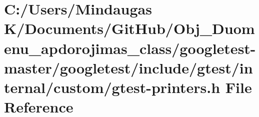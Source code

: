 \hypertarget{googletest-master_2googletest_2include_2gtest_2internal_2custom_2gtest-printers_8h}{}\section{C\+:/\+Users/\+Mindaugas K/\+Documents/\+Git\+Hub/\+Obj\+\_\+\+Duomenu\+\_\+apdorojimas\+\_\+class/googletest-\/master/googletest/include/gtest/internal/custom/gtest-\/printers.h File Reference}
\label{googletest-master_2googletest_2include_2gtest_2internal_2custom_2gtest-printers_8h}
